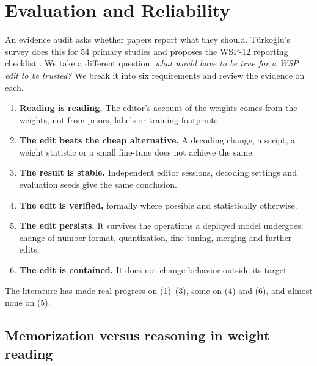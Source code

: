 \section{Evaluation and Reliability}
\label{sec:eval}

An evidence audit asks whether papers report what they should. Türkoğlu's survey does this for 54 primary studies and proposes the WSP-12 reporting checklist \citep{turkoglu2026survey}. We take a different question: \emph{what would have to be true for a WSP edit to be trusted?} We break it into six requirements and review the evidence on each.
\begin{enumerate}[leftmargin=*,itemsep=2pt]
\item \textbf{Reading is reading.} The editor's account of the weights comes from the weights, not from priors, labels or training footprints.
\item \textbf{The edit beats the cheap alternative.} A decoding change, a script, a weight statistic or a small fine-tune does not achieve the same.
\item \textbf{The result is stable.} Independent editor sessions, decoding settings and evaluation seeds give the same conclusion.
\item \textbf{The edit is verified,} formally where possible and statistically otherwise.
\item \textbf{The edit persists.} It survives the operations a deployed model undergoes: change of number format, quantization, fine-tuning, merging and further edits.
\item \textbf{The edit is contained.} It does not change behavior outside its target.
\end{enumerate}
The literature has made real progress on (1)--(3), some on (4) and (6), and almost none on (5).

\subsection{Memorization versus reasoning in weight reading}
\label{sec:memo}

